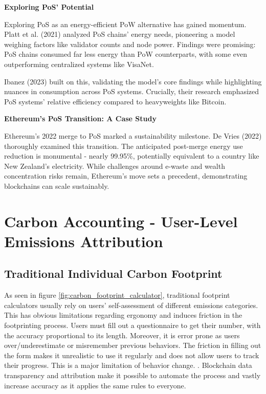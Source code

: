 \documentclass[11pt]{report}
\begin{document}
\textbf{Exploring PoS' Potential}

Exploring PoS as an energy-efficient PoW alternative has gained momentum. Platt et al. (2021)\cite{plattEnergyFootprintBlockchain2021} analyzed PoS chains' energy needs, pioneering a model weighing factors like validator counts and node power. Findings were promising: PoS chains consumed far less energy than PoW counterparts, with some even outperforming centralized systems like VisaNet.

Ibanez (2023) built on this, validating the model's core findings while highlighting nuances in consumption across PoS systems. Crucially, their research emphasized PoS systems' relative efficiency compared to heavyweights like Bitcoin.

\textbf{Ethereum's PoS Transition: A Case Study}

Ethereum's 2022 merge to PoS marked a sustainability milestone. De Vries (2022)\cite{devriesCryptocurrenciesRoadSustainability2022} thoroughly examined this transition. The anticipated post-merge energy use reduction is monumental - nearly 99.95\%, potentially equivalent to a country like New Zealand's electricity. While challenges around e-waste and wealth concentration risks remain, Ethereum's move sets a precedent, demonstrating blockchains can scale sustainably.

\section{Carbon Accounting - User-Level Emissions Attribution}


\subsection{Traditional Individual Carbon Footprint \label{se:traditional_footprint}}

As seen in figure \ref{fig:carbon_footprint_calculator}, traditional footprint calculators usually rely on users' self-assessment of different emissions categories. This has obvious limitations regarding ergonomy and induces friction in the footprinting process. Users must fill out a questionnaire to get their number, with the accuracy proportional to its length. Moreover, it is error prone as users over/underestimate or misremember previous behaviors. The friction in filling out the form makes it unrealistic to use it regularly and does not allow users to track their progress. This is a major limitation of behavior change. . Blockchain data transparency and attribution make it possible to automate the process and vastly increase accuracy as it applies the same rules to everyone.
\end{document}
